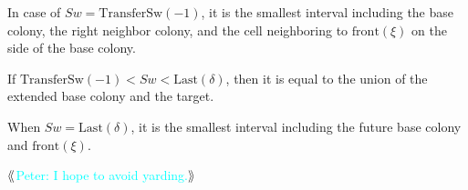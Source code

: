 \documentclass[12pt]{memoir}
\newcommand{\authnote}[3]
{{ \textcolor{#3}{\( \langle\hspace{-0.2em}\langle \)\textsf{\footnotesize #1: #2}\( \rangle\hspace{-0.2em}\rangle \)}}}
\newcommand{\authnote}[2]{}
\newcommand{\Pnote}[1]{{\authnote{Peter}{#1}{cyan}}}
\newcommand{\fld}[1]{\ensuremath{\textit{#1}}}
\def\B{B}
\newcommand{\cKind}{\fld{cKind}}
\newcommand{\Sweep}{\fld{Sw}}
\newcommand{\front}{\mathrm{front}}
\newcommand{\Last}{\mathrm{Last}}
\newcommand{\Member}{\mathrm{Member}}
\newcommand{\TransferSw}{\mathrm{TransferSw}}
\begin{document}
\begin{definition}
\begin{flushdescription}
\begin{bullets}
            \item In case of \( \Sweep = \TransferSw(-1) \),
                  it is the smallest interval including
                  the base colony, the right neighbor colony,
                  and the cell neighboring to
                  \( \front(\xi) \) on the side of the base colony.

            \item If \( \TransferSw(-1) < \Sweep < \Last(\delta) \),
                  then it is equal to the union of the extended base colony and the target.
            \item When \( \Sweep = \Last(\delta) \), it is
                  the smallest interval including the future
                  base colony and \( \front(\xi) \).
        \end{bullets}


\Pnote{I hope to avoid yarding.}










\end{flushdescription}
\end{definition}
\end{document}
